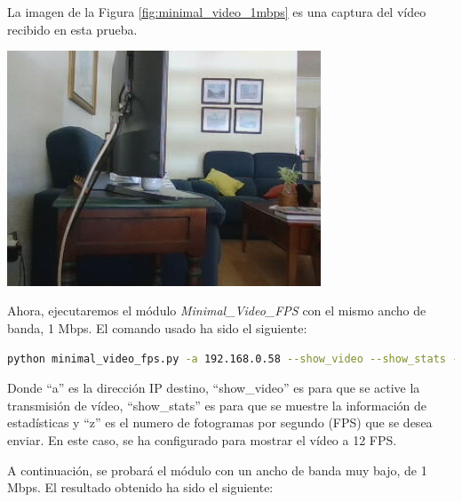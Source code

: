 La imagen de la Figura \ref{fig:minimal_video_1mbps} es una captura del vídeo recibido en esta prueba.
\begin{center}
  \includegraphics[width = 0.7\textwidth]{images/VideoRecibido1.1.png}
  \label{fig:minimal_video_1mbps}
\end{center}

\newpage

\vspace{\baselineskip}

Ahora, ejecutaremos el módulo \textit{Minimal\_Video\_FPS} con el mismo ancho de banda, 1 Mbps. El comando usado ha sido el siguiente:

\begin{lstlisting}[language=bash, basicstyle=\ttfamily\scriptsize]
    python minimal_video_fps.py -a 192.168.0.58 --show_video --show_stats -z 12
\end{lstlisting}

Donde ``a'' es la dirección IP destino, ``show\_video'' es para que se active la transmisión de vídeo, ``show\_stats'' es para que se muestre la información de estadísticas y ``z'' es el numero de fotogramas por segundo (FPS) que se desea enviar. En este caso, se ha configurado para mostrar el vídeo a 12 FPS.

A continuación, se probará el módulo con un ancho de banda muy bajo, de 1 Mbps. El resultado obtenido ha sido el siguiente:
\vspace{\baselineskip}

